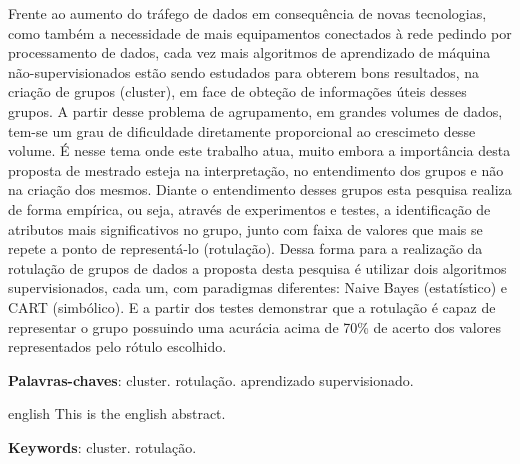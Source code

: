 
\setlength{\absparsep}{18pt} %
\begin{resumo}
Frente ao aumento do tráfego de dados em consequência de novas tecnologias, como também a necessidade de mais equipamentos  conectados à rede pedindo por processamento de dados, cada vez mais algoritmos de aprendizado de máquina não-supervisionados estão sendo estudados para obterem bons resultados, na criação de grupos (cluster), em face de obteção de informações úteis desses grupos. A partir desse problema de agrupamento, em grandes volumes de dados, tem-se um grau de dificuldade diretamente proporcional ao crescimeto desse volume. É nesse tema  onde este trabalho atua, muito embora a importância desta proposta de mestrado esteja na interpretação, no entendimento dos grupos e não na criação dos mesmos. Diante o entendimento desses grupos esta pesquisa realiza de forma empírica, ou seja, através de experimentos e testes, a identificação de atributos mais significativos no grupo, junto com faixa de valores que mais se repete a ponto de representá-lo (rotulação).  Dessa forma para a realização da rotulação de grupos de dados a proposta desta pesquisa é utilizar dois algoritmos supervisionados, cada um, com paradigmas diferentes: Naive Bayes (estatístico) e CART (simbólico). E a partir dos testes demonstrar que a rotulação é capaz de representar o grupo  possuindo uma acurácia acima de 70\% de acerto dos valores representados pelo rótulo escolhido.


  \textbf{Palavras-chaves}: cluster. rotulação. aprendizado supervisionado. 
\end{resumo}

\begin{resumo}[Abstract]
 \begin{otherlanguage*}{english}
   This is the english abstract.

   \vspace{\onelineskip}
 
   \noindent 
   \textbf{Keywords}:  cluster. rotulação.
 \end{otherlanguage*}
\end{resumo}
